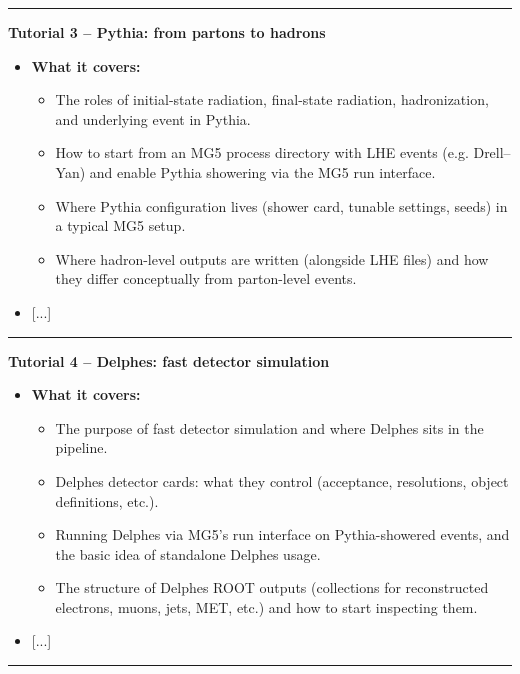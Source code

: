 \documentclass[submission, Phys]{SciPost}
\begin{document}
\begin{promptblock}[\ma (shortened)]
\begin{itemize}
\end{itemize}

\vspace{1em}
\hrule
\vspace{1em}

\textbf{Tutorial 3 – Pythia: from partons to hadrons}
\begin{itemize}
\item \textbf{What it covers:}
\begin{itemize}
\item The roles of initial-state radiation, final-state radiation, hadronization, and underlying event in Pythia.
\item How to start from an MG5 process directory with LHE events (e.g. Drell–Yan) and enable Pythia showering via the MG5 run interface.
\item Where Pythia configuration lives (shower card, tunable settings, seeds) in a typical MG5 setup.
\item Where hadron-level outputs are written (alongside LHE files) and how they differ conceptually from parton-level events.
\end{itemize}
\item {[...]}
\end{itemize}

\vspace{1em}
\hrule
\vspace{1em}

\textbf{Tutorial 4 – Delphes: fast detector simulation}
\begin{itemize}
\item \textbf{What it covers:}
\begin{itemize}
\item The purpose of fast detector simulation and where Delphes sits in the pipeline.
\item Delphes detector cards: what they control (acceptance, resolutions, object definitions, etc.).
\item Running Delphes via MG5’s run interface on Pythia-showered events, and the basic idea of standalone Delphes usage.
\item The structure of Delphes ROOT outputs (collections for reconstructed electrons, muons, jets, MET, etc.) and how to start inspecting them.
\end{itemize}
\item {[...]}
\end{itemize}

\vspace{1em}
\hrule
\vspace{1em}


\end{promptblock}
\end{document}

